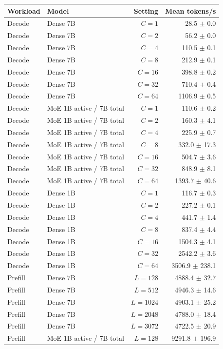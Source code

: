 \begin{tabular}{llrr}
\toprule
Workload & Model & Setting & Mean tokens/s \\
\midrule
Decode & Dense 7B & $C=1$ & 28.5 $\pm$ 0.0 \\
Decode & Dense 7B & $C=2$ & 56.2 $\pm$ 0.0 \\
Decode & Dense 7B & $C=4$ & 110.5 $\pm$ 0.1 \\
Decode & Dense 7B & $C=8$ & 212.9 $\pm$ 0.1 \\
Decode & Dense 7B & $C=16$ & 398.8 $\pm$ 0.2 \\
Decode & Dense 7B & $C=32$ & 710.4 $\pm$ 0.4 \\
Decode & Dense 7B & $C=64$ & 1106.9 $\pm$ 0.5 \\
Decode & MoE 1B active / 7B total & $C=1$ & 110.6 $\pm$ 0.2 \\
Decode & MoE 1B active / 7B total & $C=2$ & 160.3 $\pm$ 4.1 \\
Decode & MoE 1B active / 7B total & $C=4$ & 225.9 $\pm$ 0.7 \\
Decode & MoE 1B active / 7B total & $C=8$ & 332.0 $\pm$ 17.3 \\
Decode & MoE 1B active / 7B total & $C=16$ & 504.7 $\pm$ 3.6 \\
Decode & MoE 1B active / 7B total & $C=32$ & 848.9 $\pm$ 8.1 \\
Decode & MoE 1B active / 7B total & $C=64$ & 1393.7 $\pm$ 40.6 \\
Decode & Dense 1B & $C=1$ & 116.7 $\pm$ 0.3 \\
Decode & Dense 1B & $C=2$ & 227.2 $\pm$ 0.1 \\
Decode & Dense 1B & $C=4$ & 441.7 $\pm$ 1.4 \\
Decode & Dense 1B & $C=8$ & 837.4 $\pm$ 4.4 \\
Decode & Dense 1B & $C=16$ & 1504.3 $\pm$ 4.1 \\
Decode & Dense 1B & $C=32$ & 2542.2 $\pm$ 3.6 \\
Decode & Dense 1B & $C=64$ & 3506.9 $\pm$ 238.1 \\
Prefill & Dense 7B & $L=128$ & 4888.4 $\pm$ 32.7 \\
Prefill & Dense 7B & $L=512$ & 4946.3 $\pm$ 14.6 \\
Prefill & Dense 7B & $L=1024$ & 4903.1 $\pm$ 25.2 \\
Prefill & Dense 7B & $L=2048$ & 4788.0 $\pm$ 18.4 \\
Prefill & Dense 7B & $L=3072$ & 4722.5 $\pm$ 20.9 \\
Prefill & MoE 1B active / 7B total & $L=128$ & 9291.8 $\pm$ 196.9 \\

\end{tabular}
